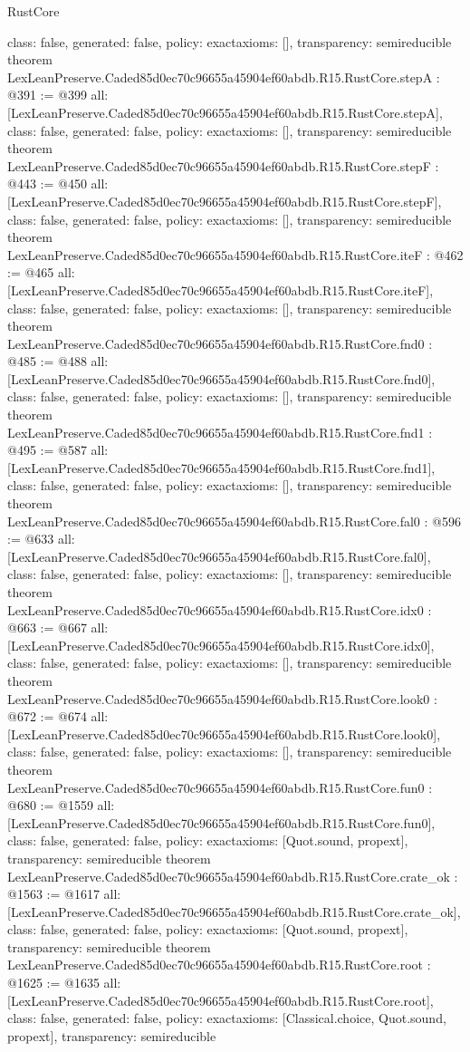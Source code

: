 \begin{lexlean}{RustCore}
\begin{coremodule}
{  class: false,
  generated: false,
  policy: exact{axioms: []},
  transparency: semireducible
}
theorem LexLeanPreserve.Caded85d0ec70c96655a45904ef60abdb.R15.RustCore.stepA : @391 := @399 {
  all: [LexLeanPreserve.Caded85d0ec70c96655a45904ef60abdb.R15.RustCore.stepA],
  class: false,
  generated: false,
  policy: exact{axioms: []},
  transparency: semireducible
}
theorem LexLeanPreserve.Caded85d0ec70c96655a45904ef60abdb.R15.RustCore.stepF : @443 := @450 {
  all: [LexLeanPreserve.Caded85d0ec70c96655a45904ef60abdb.R15.RustCore.stepF],
  class: false,
  generated: false,
  policy: exact{axioms: []},
  transparency: semireducible
}
theorem LexLeanPreserve.Caded85d0ec70c96655a45904ef60abdb.R15.RustCore.iteF : @462 := @465 {
  all: [LexLeanPreserve.Caded85d0ec70c96655a45904ef60abdb.R15.RustCore.iteF],
  class: false,
  generated: false,
  policy: exact{axioms: []},
  transparency: semireducible
}
theorem LexLeanPreserve.Caded85d0ec70c96655a45904ef60abdb.R15.RustCore.fnd0 : @485 := @488 {
  all: [LexLeanPreserve.Caded85d0ec70c96655a45904ef60abdb.R15.RustCore.fnd0],
  class: false,
  generated: false,
  policy: exact{axioms: []},
  transparency: semireducible
}
theorem LexLeanPreserve.Caded85d0ec70c96655a45904ef60abdb.R15.RustCore.fnd1 : @495 := @587 {
  all: [LexLeanPreserve.Caded85d0ec70c96655a45904ef60abdb.R15.RustCore.fnd1],
  class: false,
  generated: false,
  policy: exact{axioms: []},
  transparency: semireducible
}
theorem LexLeanPreserve.Caded85d0ec70c96655a45904ef60abdb.R15.RustCore.fal0 : @596 := @633 {
  all: [LexLeanPreserve.Caded85d0ec70c96655a45904ef60abdb.R15.RustCore.fal0],
  class: false,
  generated: false,
  policy: exact{axioms: []},
  transparency: semireducible
}
theorem LexLeanPreserve.Caded85d0ec70c96655a45904ef60abdb.R15.RustCore.idx0 : @663 := @667 {
  all: [LexLeanPreserve.Caded85d0ec70c96655a45904ef60abdb.R15.RustCore.idx0],
  class: false,
  generated: false,
  policy: exact{axioms: []},
  transparency: semireducible
}
theorem LexLeanPreserve.Caded85d0ec70c96655a45904ef60abdb.R15.RustCore.look0 : @672 := @674 {
  all: [LexLeanPreserve.Caded85d0ec70c96655a45904ef60abdb.R15.RustCore.look0],
  class: false,
  generated: false,
  policy: exact{axioms: []},
  transparency: semireducible
}
theorem LexLeanPreserve.Caded85d0ec70c96655a45904ef60abdb.R15.RustCore.fun0 : @680 := @1559 {
  all: [LexLeanPreserve.Caded85d0ec70c96655a45904ef60abdb.R15.RustCore.fun0],
  class: false,
  generated: false,
  policy: exact{axioms: [Quot.sound, propext]},
  transparency: semireducible
}
theorem LexLeanPreserve.Caded85d0ec70c96655a45904ef60abdb.R15.RustCore.crate_ok : @1563 := @1617 {
  all: [LexLeanPreserve.Caded85d0ec70c96655a45904ef60abdb.R15.RustCore.crate_ok],
  class: false,
  generated: false,
  policy: exact{axioms: [Quot.sound, propext]},
  transparency: semireducible
}
theorem LexLeanPreserve.Caded85d0ec70c96655a45904ef60abdb.R15.RustCore.root : @1625 := @1635 {
  all: [LexLeanPreserve.Caded85d0ec70c96655a45904ef60abdb.R15.RustCore.root],
  class: false,
  generated: false,
  policy: exact{axioms: [Classical.choice, Quot.sound, propext]},
  transparency: semireducible
}


\end{coremodule}
\end{lexlean}
